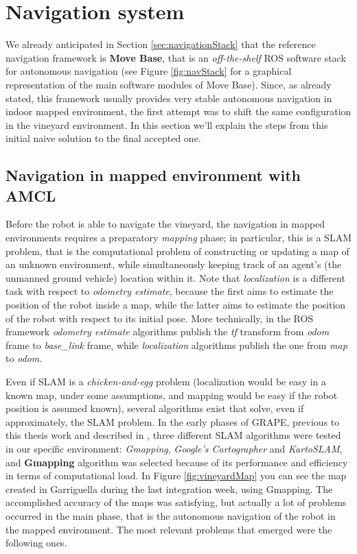 \section{Navigation system}\label{sec:navigationSystem}

We already anticipated in Section \ref{sec:navigationStack} that the reference navigation framework is \textbf{Move Base}, that is an \textit{off-the-shelf} \ac{ROS} software stack for autonomous navigation (see Figure \ref{fig:navStack} for a graphical representation of the main software modules of Move Base). Since, as already stated, this framework usually provides very stable autonomous navigation in indoor mapped environment, the first attempt was to shift the same configuration in the vineyard environment. 
In this section we'll explain the steps from this initial naive solution to the final accepted one.

\subsection{Navigation in mapped environment with AMCL}

Before the robot is able to navigate the vineyard, the navigation in mapped environments requires a preparatory \textit{mapping} phase; in particular, this is a \ac{SLAM} problem, that is the computational problem of constructing or updating a map of an unknown environment, while simultaneously keeping track of an agent's (the unmanned ground vehicle) location within it. Note that \textit{localization} is a different task with respect to \textit{odometry estimate}, because the first aims to estimate the position of the robot inside a map, while the latter aims to estimate the position of the robot with respect to its initial pose. More technically, in the \ac{ROS} framework \textit{odometry estimate} algorithms publish the \textit{tf} transform from \textit{odom} frame to \textit{base\_link} frame, while \textit{localization} algorithms publish the one from \textit{map} to \textit{odom}.

\par Even if \ac{SLAM} is a \textit{chicken-and-egg} problem (localization would be easy in a known map, under some assumptions, and mapping would be easy if the robot position is assumed known), several algorithms exist that solve, even if approximately, the \ac{SLAM} problem. In the early phases of \ac{GRAPE}, previous to this thesis work and described in \cite{grapeAltroPaper}, three different \ac{SLAM} algorithms were tested in our specific environment: \textit{Gmapping}, \textit{Google's Cartographer} and \textit{KartoSLAM}, and \textbf{Gmapping} algorithm was selected because of its performance and efficiency in terms of computational load. In Figure \ref{fig:vineyardMap} you can see the map created in Garriguella during the last integration week, using Gmapping. The accomplished accuracy of the maps was satisfying, but actually a lot of problems occurred in the main phase, that is the autonomous navigation of the robot in the mapped environment. The most relevant problems that emerged were the following ones. 

